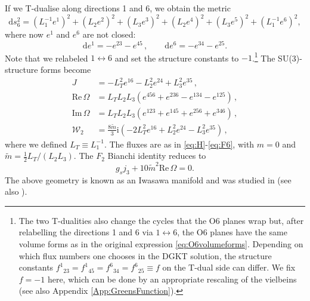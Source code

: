 \documentclass[11pt]{article}
\newcommand{\be}{\begin{equation}}
\newcommand{\ee}{\end{equation}}
\def\be{\begin{equation}}
\def\ee{\end{equation}}
\renewcommand{\[}{\left[}
\renewcommand{\]}{\right]}
\renewcommand{\(}{\left(}
\renewcommand{\)}{\right)}
\renewcommand{\Im}{\text{Im}\,}
\renewcommand{\Re}{\text{Re}\,}
\newcommand{\rmi}{\textrm{i}}
\newcommand{\dd}{\mathrm{d}}
\newcommand{\<}{\langle}
\renewcommand{\>}{\rangle}
\begin{document}
If we T-dualise along directions 1 and 6, we obtain the metric
 \be
	\dd s_6^2 = (L_1^{-1} e^1)^2 + (L_2 e^2)^2 + (L_3 e^3)^2 + (L_2 e^4)^2 + (L_3 e^5)^2 + ( L_1^{-1} e^6)^2,
\ee
where now $e^1$ and $e^6$ are not closed:
\begin{equation}
\label{geomflux}
\dd e^{1} = -e^{23} - e^{45}\,,\qquad \dd e^{6} = - e^{34} - e^{25}.
\end{equation}
Note that we relabeled $1 \leftrightarrow 6$ and set the structure constants to $-1$.\footnote{The two T-dualities also change the cycles that the O6 planes wrap but, after relabelling the directions 1 and 6 via $1 \leftrightarrow 6$, the O6 planes have the same volume forms as in the original expression \eqref{eq:O6volumeforms}. Depending on which flux numbers one chooses in the DGKT solution, the structure constants $f^1{}_{23}=f^1{}_{45}=f^6{}_{34}=f^6{}_{25}\equiv f$ on the T-dual side can differ. We fix $f=-1$ here, which can be done by an appropriate rescaling of the vielbeins (see also Appendix \ref{App:GreensFunction}).}
The SU(3)-structure forms become
\begin{align}
\label{J}
	J &= -L_T^{2} e^{16} - L_2^2e^{24} + L_3^2 e^{35}\,,\\
	\label{OmegaR}
	\Re \Omega &=  L_T L_2 L_3 \left( e^{456} + e^{236} - e^{134} - e^{125}\right)\,,\\
	\label{OmegaI}
	\Im \Omega &=   L_T L_2 L_3 \left(e^{123} + e^{145} + e^{256} + e^{346} \right)\,,\\
	 \mathcal{W}_2 &= \frac{8 \tilde{m}}{3}\rmi \left(-2L_T^{2}e^{16} +L_2^2e^{24}- L_3^2 e^{35}\right)\,, \label{w2}
\end{align}
where we defined $L_T \equiv L_1^{-1}$. The fluxes are as in \eqref{eq:H}-\eqref{eq:F6}, with $m = 0$ and $\tilde m =\frac12 L_T/(L_2 L_3)$. The $F_2$ Bianchi identity reduces to
\begin{equation}
\label{eq:BISU3}
g_s j_3 + 10 \tilde m^2 \Re \Omega =0.
\end{equation}
The above geometry is known as an Iwasawa manifold and was studied in \cite{Caviezel:2008ik} (see also \cite{Derendinger:2004jn, Villadoro:2005cu, Camara:2005dc}). 
\end{document}

